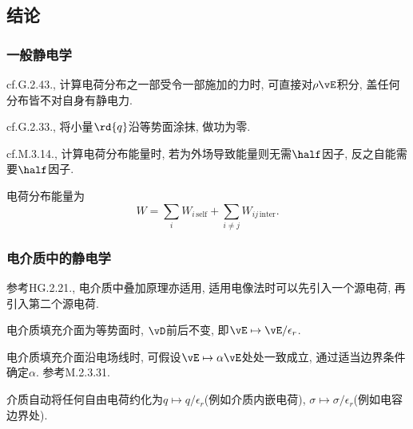 \documentclass{ctexart}
\begin{document}

\subsection{结论} %
\label{sub:结论}

\subsubsection{一般静电学} %
\label{ssub:一般静电学}

\begin{finale}
	cf.G.2.43., 计算电荷分布之一部受令一部施加的力时, 可直接对$\rho \vE$积分, 盖任何分布皆不对自身有静电力. 
\end{finale}
\begin{finale}
	cf.G.2.33., 将小量$\rd{q}$沿等势面涂抹, 做功为零.
\end{finale}
\begin{pitfall}
	cf.M.3.14., 计算电荷分布能量时, 若为外场导致能量则无需$\half$因子, 反之自能需要$\half$因子.
\end{pitfall}
\begin{finale}
	电荷分布能量为
	\[ W = \sum_i W_{i\,\text{self}} + \sum_{i\neq j} W_{ij\,\text{inter}}. \]
\end{finale}


\subsubsection{电介质中的静电学} %
\label{ssub:电介质中的静电学}

\begin{finale}
	参考HG.2.21., 电介质中叠加原理亦适用, 适用电像法时可以先引入一个源电荷, 再引入第二个源电荷.
\end{finale}
\begin{finale}
	\begin{cenum}
		\item 电介质填充介面为等势面时, $\vD$前后不变, 即$\vE \mapsto \vE/\epsilon_r$.
		\item 电介质填充介面沿电场线时, 可假设$\vE \mapsto \alpha \vE$处处一致成立, 通过适当边界条件确定$\alpha$. 参考M.2.3.31.
	\end{cenum}
\end{finale}
\begin{finale}
	介质自动将任何自由电荷约化为$q\mapsto q/\epsilon_r$(例如介质内嵌电荷), $\sigma\mapsto \sigma/\epsilon_r$(例如电容边界处).
\end{finale}
\end{document}
